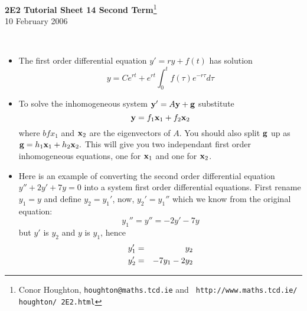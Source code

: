 \documentclass[12pt]{article}
\begin{document}
\begin{center}
{\bf 2E2 Tutorial Sheet 14 Second Term}\footnote{Conor
Houghton, {\tt houghton@maths.tcd.ie} and {\tt
http://www.maths.tcd.ie/ houghton/ 2E2.html}}
\\[1cm]
 10 February 2006
\end{center}
{
\\
\begin{itemize}
\item The first order differential equation $y'=ry+f(t)$ has solution
\begin{equation}
y=Ce^{rt}+e^{rt}\int^t_0{f(\tau)e^{-r\tau}d\tau}
\end{equation}
\item To solve the inhomogeneous system ${\bf y}'=A{\bf y}+{\bf g}$ substitute 
\begin{equation}
{\bf y}=f_1{\bf x}_1+f_2{\bf x}_2
\end{equation}
where ${bf x}_1$ and ${\bf x}_2$ are the eigenvectors of $A$. You should also
split ${\bf g}$ up as ${\bf g}=h_1{\bf x}_1+h_2{\bf x}_2.$ This will
give you two independant first order inhomogeneous equations, one for
${\bf x}_1$ and one for ${\bf x}_2$.
\item Here is an example of converting the second order differential equation $y''+2y'+7y=0$ into a system first order differential equations. First rename $y_1=y$ and define $y_2=y_1'$, now, $y_2'=y_1''$ which we know from the original equation:
\begin{equation}
y_1''=y''=-2y'-7y
\end{equation}
but $y'$ is $y_2$ and $y$ is $y_1$, hence
\begin{eqnarray}
y_1'&=&y_2\cr
y_2'&=&-7y_1-2y_2
\end{eqnarray} 
\end{itemize}
\newpage
{}
}
\end{document}

